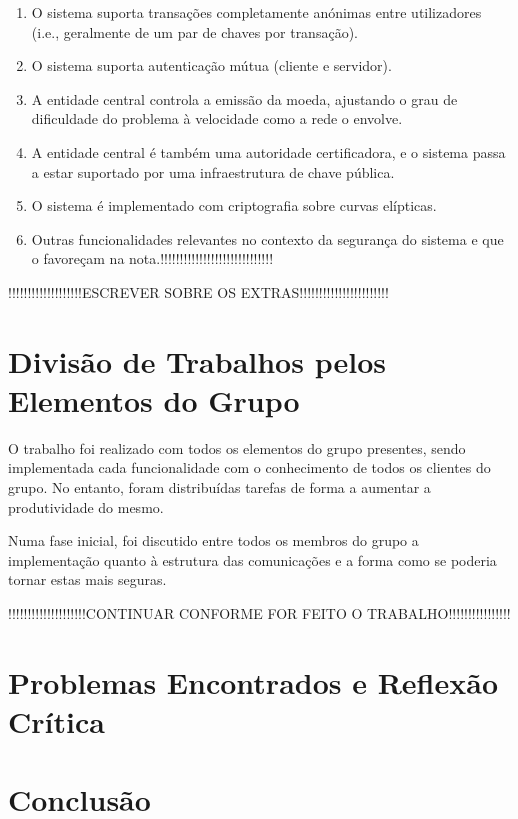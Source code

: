 \begin{enumerate}
    \item O sistema suporta transações completamente anónimas entre utilizadores (i.e., geralmente de um par de chaves por transação).
    
    \item O sistema suporta autenticação mútua (cliente e servidor).
    
    \item A entidade central controla a emissão da moeda, ajustando o grau de dificuldade do problema à velocidade como a rede o envolve.
    
    \item A entidade central é também uma autoridade certificadora, e o sistema passa a estar suportado por uma infraestrutura de chave pública.
    
    \item O sistema é implementado com criptografia sobre curvas elípticas.
    
    \item Outras funcionalidades relevantes no contexto da segurança do sistema e que o favoreçam na nota.!!!!!!!!!!!!!!!!!!!!!!!!!!!!!
\end{enumerate}    
    
    
    !!!!!!!!!!!!!!!!!!!ESCREVER SOBRE OS EXTRAS!!!!!!!!!!!!!!!!!!!!!!!
    
\section{Divisão de Trabalhos pelos Elementos do Grupo}
\label{sec:divisao}
O trabalho foi realizado com todos os elementos do grupo presentes, sendo implementada cada funcionalidade com o conhecimento de todos os clientes do grupo. No entanto, foram distribuídas tarefas de forma a aumentar a produtividade do mesmo.


Numa fase inicial, foi discutido entre todos os membros do grupo a implementação quanto à estrutura das comunicações e a forma como se poderia tornar estas mais seguras.

!!!!!!!!!!!!!!!!!!!!CONTINUAR CONFORME FOR FEITO O TRABALHO!!!!!!!!!!!!!!!!



\section{Problemas Encontrados e Reflexão Crítica}
\label{sec:problemas}

\section{Conclusão}
\label{sec:conclusaoReflexao}